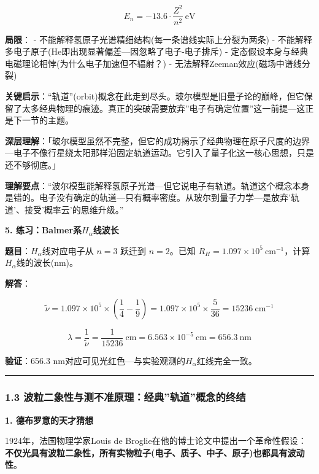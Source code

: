 \documentclass[a4paper,11pt]{ctexart}
\newcommand{\箭}{\ensuremath{\rightarrow}}
\newcommand{\左箭}{\ensuremath{\leftarrow}}
\newcommand{\上箭}{\ensuremath{\uparrow}}
\newcommand{\下箭}{\ensuremath{\downarrow}}
\newcommand{\衡}{\ensuremath{\rightleftharpoons}}
\newcommand{\双箭}{\ensuremath{\leftrightarrow}}
\newcommand{\约等于}{\ensuremath{\approx}}
\newcommand{\小于等于}{\ensuremath{\leq}}
\newcommand{\大于等于}{\ensuremath{\geq}}
\newcommand{\不等于}{\ensuremath{\neq}}
\newcommand{\西格马}{\ensuremath{\sigma}}
\newcommand{\派}{\ensuremath{\pi}}
\begin{document}
\[E_n = -13.6 \cdot \frac{Z^2}{n^2}\ \mathrm{eV}\]

\textbf{局限}：
- 不能解释氢原子光谱精细结构(每一条谱线实际上分裂为两条)
- 不能解释多电子原子(He即出现显著偏差---因忽略了电子-电子排斥)
- 定态假设本身与经典电磁理论相悖(为什么电子加速但不辐射？)
- 无法解释Zeeman效应(磁场中谱线分裂)

\textbf{关键启示}：``轨道''(orbit)概念在此走到尽头。玻尔模型是旧量子论的巅峰，但它保留了太多经典物理的痕迹。真正的突破需要放弃''电子有确定位置''这一前提---这正是下一节的主题。

\textbf{深层理解}：「玻尔模型虽然不完整，但它的成功揭示了经典物理在原子尺度的边界---电子不像行星绕太阳那样沿固定轨道运动。它引入了量子化这一核心思想，只是还不够彻底。」

\textbf{理解要点}：``波尔模型能解释氢原子光谱---但它说电子有轨道。轨道这个概念本身是错的。电子没有确定的轨道---只有概率密度。从玻尔到量子力学---是放弃'轨道'、接受'概率云'的思维升级。''

\textbf{5. 练习：Balmer系\(H_\alpha\)线波长}

\textbf{题目}：\(H_\alpha\)线对应电子从 \(n=3\) 跃迁到 \(n=2\)。已知 \(R_H = 1.097 \times 10^5\ \mathrm{cm^{-1}}\)，计算\(H_\alpha\)线的波长(nm)。

\textbf{解答}：

\[
\tilde{\nu} = 1.097\times 10^5 \times \left(\frac{1}{4} - \frac{1}{9}\right) = 1.097\times 10^5 \times \frac{5}{36} = 15236\ \mathrm{cm^{-1}}
\]

\[
\lambda = \frac{1}{\tilde{\nu}} = \frac{1}{15236}\ \mathrm{cm} = 6.563\times 10^{-5}\ \mathrm{cm} = 656.3\ \mathrm{nm}
\]

\textbf{验证}：656.3 nm对应可见光红色---与实验观测的\(H_\alpha\)红线完全一致。

\begin{center}\rule{0.5\linewidth}{0.5pt}\end{center}

\subsubsection{1.3 波粒二象性与测不准原理：经典''轨道''概念的终结}\label{ux6ce2ux7c92ux4e8cux8c61ux6027ux4e0eux6d4bux4e0dux51c6ux539fux7406ux7ecfux5178ux8f68ux9053ux6982ux5ff5ux7684ux7ec8ux7ed3}

\textbf{1. 德布罗意的天才猜想}

1924年，法国物理学家Louis de Broglie在他的博士论文中提出一个革命性假设：\textbf{不仅光具有波粒二象性，所有实物粒子(电子、质子、中子、原子)也都具有波动性}。
\end{document}
